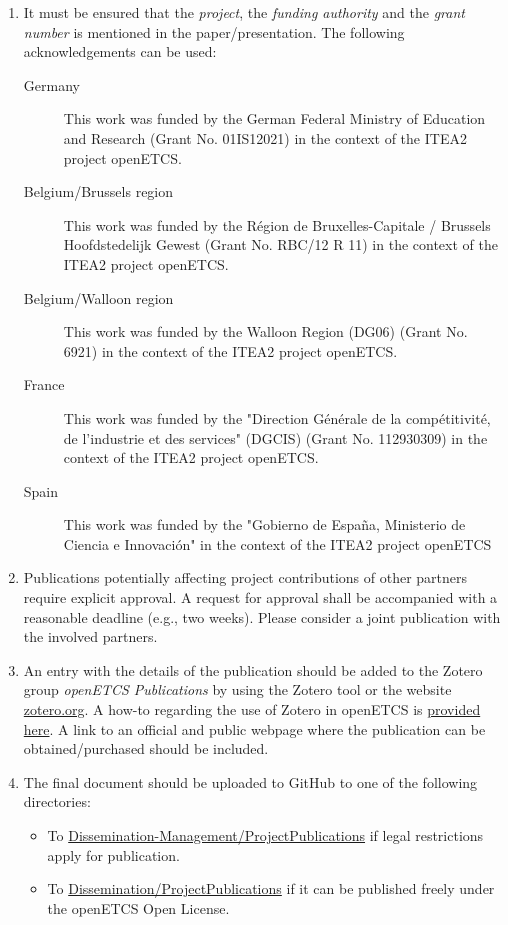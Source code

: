 \documentclass{template/openetcs_article}
\begin{document}
\begin{enumerate}
  \item  It must be ensured that the \emph{project}, the \emph{funding authority} and the \emph{grant number} is mentioned in the paper/presentation. The following acknowledgements can be used:
  \begin{description}
    \item[Germany] This work was funded by the German Federal Ministry of Education and Research (Grant No. 01IS12021) in the context of the ITEA2 project openETCS.
    \item[Belgium/Brussels region] This work was funded by the Région de Bruxelles-Capitale / Brussels Hoofdstedelijk Gewest (Grant No. RBC/12 R 11) in the context of the ITEA2 project openETCS.
    \item[Belgium/Walloon region] This work was funded by the Walloon Region (DG06) (Grant No. 6921) in the context of the ITEA2 project openETCS.
    \item[France] This work was funded by the "Direction Générale de la compétitivité, de l’industrie et des services" (DGCIS)  (Grant No. 112930309) in the context of the ITEA2 project openETCS.
    \item[Spain] This work was funded by the "Gobierno de España, Ministerio de Ciencia e Innovación" in the context of the ITEA2 project openETCS
  \end{description}

\item Publications potentially affecting project contributions of other partners require explicit approval. A request for approval shall be accompanied with a reasonable deadline (e.g., two weeks). Please consider a joint publication with the involved partners.

\item An entry with the details of the publication should be added to the Zotero group \emph{openETCS Publications} by using the Zotero tool or the website \href{http://www.zotero.org}{zotero.org}. A how-to regarding the use of Zotero in openETCS is \href{https://github.com/openETCS/Dissemination/wiki/Management-of-Publications-and-References-with-Zotero}{provided here}. A link to an official and public webpage where the publication can be obtained/purchased should be included.

\item The final document should be uploaded to GitHub to one of the following directories:
  \begin{itemize}
    \item To \href{https://github.com/openETCS/dissemination-management/tree/master/ProjectPublications}{Dissemination-Management/ProjectPublications} if legal restrictions apply for publication.
    \item To \href{https://github.com/openETCS/Dissemination/tree/master/ProjectPublications}{Dissemination/ProjectPublications} if it can be published freely under the openETCS Open License.
  \end{itemize}
\end{enumerate}
\end{document}
